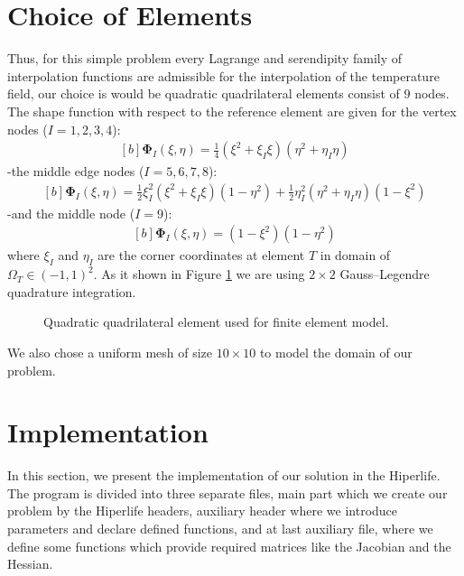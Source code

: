 \documentclass[]{article}
\begin{document}
\section{Choice of Elements} \label{sec: coe}
Thus, for this simple problem every Lagrange and serendipity family of interpolation functions are admissible for the interpolation of the temperature field, our choice is would be quadratic quadrilateral elements consist of $9$ nodes. The shape function with respect to the reference element are given for the vertex nodes ($I = 1, 2, 3, 4$):
\begin{equation}\label{eq21}
	\begin{aligned}[b]
		\boldsymbol{\Phi}_{I}(\xi, \eta) = \frac{1}{4}(\xi^2+\xi_I\xi)(\eta^2+\eta_I\eta)
	\end{aligned}
\end{equation}
-the middle edge nodes ($I = 5, 6, 7, 8$):
\begin{equation}\label{eq22}
	\begin{aligned}[b]
		\boldsymbol{\Phi}_{I}(\xi, \eta) = \frac{1}{2}\xi_I^2(\xi^2+\xi_I\xi)(1-\eta^2) + \frac{1}{2}\eta_I^2(\eta^2+\eta_I\eta)(1-\xi^2)
	\end{aligned}
\end{equation}
-and the middle node ($I = 9$):
\begin{equation}\label{eq23}
	\begin{aligned}[b]
		\boldsymbol{\Phi}_{I}(\xi, \eta) = (1-\xi^2)(1-\eta^2)
	\end{aligned}
\end{equation}
where $\xi_{I}$ and $\eta_{I}$ are the corner coordinates at element $T$ in domain of $\Omega_{T} \in (-1,1)^2$. As it shown in Figure \ref{fig_el} we are using $2 \times 2$ Gauss–Legendre quadrature integration.
\begin{figure}[htbp]
	\centering
	
	\caption{Quadratic quadrilateral element used for finite element model.}
	\label{fig_el}
\end{figure}
We also chose a uniform mesh of size $10 \times 10$ to model the domain of our problem.
\section{Implementation} \label{sec: imp}
In this section, we present the implementation of our solution in the Hiperlife. The program is divided into three separate files, main part which we create our problem by the Hiperlife headers, auxiliary header where we introduce parameters and declare defined functions, and at last auxiliary file, where we define some functions which provide required matrices like the Jacobian and the Hessian.
\end{document}
